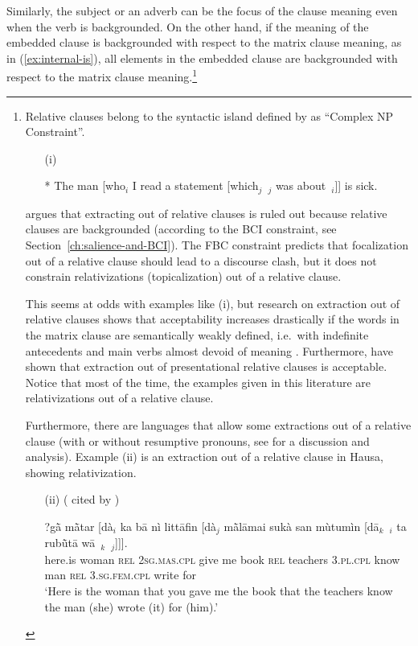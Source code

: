 Similarly, the subject or an adverb can be the focus of the clause meaning even when the verb is backgrounded. On the other hand, if the meaning of the embedded clause is backgrounded with respect to the matrix clause meaning, as in (\ref{ex:internal-is}), all elements in the embedded clause are backgrounded with respect to the matrix clause meaning.\footnote{Relative clauses belong to the syntactic island defined by \citet{Ross.1967} as ``Complex NP Constraint''. 

\begin{itemize}
    \item[(i)] \citep[119]{Ross.1967}
    \item[] * The man [who$_i$ I read a statement [which$_j$~\trace{}$_j$ was about~\trace{}$_i$]] is sick. 
\end{itemize}

\citet{Goldberg.2013} argues that extracting out of relative clauses is ruled out because relative clauses are backgrounded (according to the BCI constraint, see Section~\ref{ch:salience-and-BCI}). The FBC constraint predicts that focalization out of a relative clause should lead to a discourse clash, but it does not constrain relativizations (topicalization) out of a relative clause. 

This seems at odds with examples like (i), but research on extraction out of relative clauses shows that acceptability increases drastically if the words in the matrix clause are semantically weakly defined, i.e.\ with indefinite antecedents \citep{Kluender.1998} and main verbs almost devoid of meaning \citep[91--92]{Chaves.2020.UDC}. Furthermore, \citet{Erteschik-shir.1979} have shown that extraction out of presentational relative clauses is acceptable. Notice that most of the time, the examples given in this literature are relativizations out of a relative clause.

Furthermore, there are languages that allow some extractions out of a relative clause (with or without resumptive pronouns, see \citet{Crysmann.2012} for a discussion and analysis). Example (ii) is an extraction out of a relative clause in Hausa, showing relativization.

\begin{itemize}
    \item[(ii)] (\citealt[84]{Tuller.1986} cited by \citealt[55]{Crysmann.2012})
    \item[] \gll ?g\`{\=a} m\`{\=a}tar [dà$_i$ ka b\=a nì litt\=afin [dà$_j$ m\`{\=a}l\=amai sukà san mùtumìn [d\=a$_k$~\trace{}$_i$ ta rub\`{\=u}t\=a w\=a~\trace{}$_k$~\trace{}$_j$]]].\\
\sbar{}here.is woman \sbar{}\textsc{rel} 2\textsc{sg.mas.cpl} give me book \sbar{}\textsc{rel} teachers 3\textsc{.pl.cpl} know man \sbar{}\textsc{rel} 3\textsc{.sg.fem.cpl} write for\\
\glt `Here is the woman that you gave me the book that the teachers know the man (she) wrote (it) for (him).'
\end{itemize}

}
